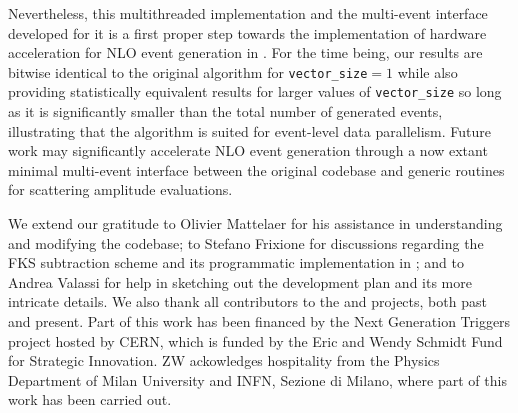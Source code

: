 \documentclass[a4paper,11pt]{article}
\begin{document}
Nevertheless, this multithreaded implementation and the multi-event interface developed for it is a first proper step towards the implementation of hardware acceleration for NLO event generation in \mg{}. For the time being, our results are bitwise identical to the original algorithm for \texttt{vector\_size}$=1$ while also providing statistically equivalent results for larger values of \texttt{vector\_size} so long as it is significantly smaller than the total number of generated events, illustrating that the algorithm is suited for event-level data parallelism. Future work may significantly accelerate NLO event generation through a now extant minimal multi-event interface between the original codebase and generic routines for scattering amplitude evaluations.


\acknowledgments
We extend our gratitude to Olivier Mattelaer for his assistance in understanding and modifying the codebase; to Stefano Frixione for discussions regarding the FKS subtraction scheme and its programmatic implementation in \madgraph{}; and to Andrea Valassi for help in sketching out the development plan and its more intricate details. We also thank all contributors to the \madgraph{} and \cudacpp{} projects, both past and present. Part of this work has been financed by the Next Generation Triggers project hosted by CERN, which is funded by the Eric and Wendy Schmidt Fund for Strategic Innovation. ZW ackowledges hospitality from the Physics Department of Milan University and INFN, Sezione di Milano, where part of this work has been carried out.










\printbibliography[heading=subbibintoc]
\end{document}
